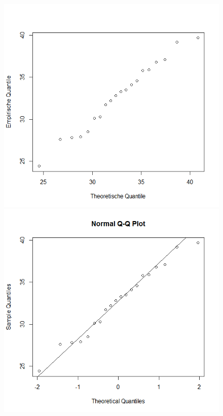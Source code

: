				\begin{figure}[H]
					\begin{minipage}[c]{0.5\textwidth}
						\includegraphics[width=1\linewidth]{images/qqPlot.png}
					\end{minipage}\hfill
					\begin{minipage}[c]{0.5\textwidth}
						\includegraphics[width=1\linewidth]{images/qqNormLine.png}
					\end{minipage}\\
					\begin{minipage}[t]{.5\textwidth}
					\end{minipage}\hfill
					\begin{minipage}[t]{.5\textwidth}
					\end{minipage}
				\end{figure}
